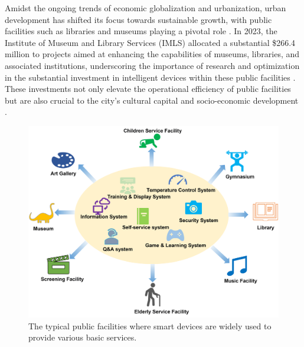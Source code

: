 \documentclass[preprint,12pt]{elsarticle}
\begin{document}
Amidst the ongoing trends of economic globalization and urbanization, urban development has shifted its focus towards sustainable growth, with public facilities such as libraries and museums playing a pivotal role \cite{tan2020cultural,Bi2022584,Bi2022}. In 2023, the Institute of Museum and Library Services (IMLS) allocated a substantial \$266.4 million to projects aimed at enhancing the capabilities of museums, libraries, and associated institutions, underscoring the importance of research and optimization in the substantial investment in intelligent devices within these public facilities \cite{imls_website}. These investments not only elevate the operational efficiency of public facilities but are also crucial to the city's cultural capital and socio-economic development \cite{oteros2018using,rivero2020sustainable,imls_2021_afr}.


\begin{figure}[h]
	\centering
	\includegraphics[width=\linewidth]{fig_schema.png}
	\caption{The typical public facilities where smart devices are widely used to provide various basic services.}
	\label{fig_schema}
\end{figure}
\end{document}
